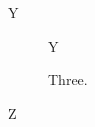 \documentclass{article}
\begin{document}
\begin{algorithm}[h]Y\caption{Two.}\end{algorithm}
\begin{figure}[h]Y\caption{Three.}\end{figure}
\begin{program}[h]Z\caption{Four.}\end{program}
\end{document}
